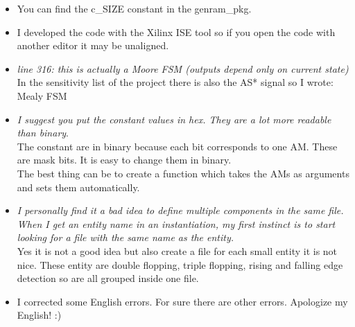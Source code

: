\documentclass[a4paper,11pt]{article}
\begin{document}
\begin{itemize}
\item You can find the c\_SIZE constant in the genram\_pkg.\\
\item I developed the code with the Xilinx ISE tool so if you open the code with another editor it may be unaligned.
\item \textit{line 316: this is actually a Moore FSM (outputs depend only on current state)}\\
In the sensitivity list of the project there is also the AS* signal so I wrote: Mealy FSM
\item \textit{I suggest you put the constant values in hex. They are a lot more
readable than binary}.\\
The constant are in binary because each bit corresponds to one AM. These are mask bits.
It is easy to change them in binary.\\
The best thing can be to create a function which takes the AMs as arguments and sets them automatically.
\item \textit{I personally find it a bad idea to define multiple components in the same file.
When I get an entity name in an instantiation, my first instinct is to start
looking for a file with the same name as the entity.}\\

Yes it is not a good idea but also create a file for each small entity it is not nice. These entity are
double flopping, triple flopping, rising and falling edge detection so are all grouped inside one file.\\
\item I corrected some English errors. For sure there are other errors. Apologize my English! :) 
\end{itemize}
\newpage
\end{document}
